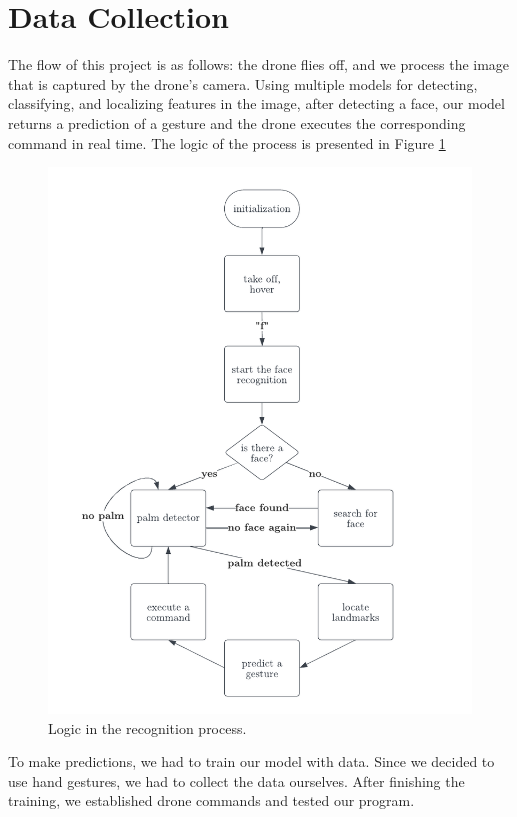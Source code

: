 \section{Data Collection}
The flow of this project is as follows: the drone flies off, and we process the image that is captured by the drone's camera. Using multiple models for detecting, classifying, and localizing features in the image, after detecting a face, our model returns a prediction of a gesture and the drone executes the corresponding command in real time. The logic of the process is presented in Figure \ref{fig:flowchart}


\begin{figure}
	\centering
	\includegraphics[width = \textwidth]{images/flowchart.pdf}
	\caption{Logic in the recognition process.}
	\label{fig:flowchart}
\end{figure}


To make predictions, we had to train our model with data. Since we decided to use hand gestures, we had to collect the data ourselves. After finishing the training, we established drone commands and tested our program.

